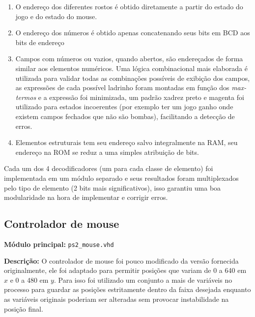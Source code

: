\documentclass[12pt]{article}
\begin{document}
\begin{enumerate}

	\item O endereço dos diferentes rostos é obtido diretamente a partir do 
		estado do jogo e do estado do mouse.
		
	\item O endereço dos números é obtido apenas concatenando seus bits em
		BCD aos bits de endereço
		
	\item Campos com números ou vazios, quando abertos, são endereçados de 
		forma similar aos elementos numéricos. Uma lógica combinacional mais elaborada é
		utilizada para validar todas as combinações possíveis de exibição dos
		campos, as expressões de cada possível ladrinho foram montadas em
		função dos \emph{max-termos} e a expressão foi minimizada, um padrão
		xadrez preto e magenta foi utilizado para estados incoerentes (por
		exemplo ter um jogo ganho onde existem campos fechados que não são 
		bombas), facilitando a detecção de erros.

	\item Elementos estruturais tem seu endereço salvo integralmente na RAM,
		seu endereço na ROM se reduz a uma simples atribuição de bits.

\end{enumerate}

Cada um dos 4 decodificadores (um para cada classe de elemento) foi 
implementada em um módulo separado e seus resultados foram multiplexados pelo
tipo de elemento (2 bits mais significativos), isso garantiu uma boa 
modularidade na hora de implementar e corrigir erros.


\subsection{Controlador de mouse}
\label{sec:ctrlmouse}

{\bf Módulo principal:} \verb|ps2_mouse.vhd|

{\bf Descrição:} O controlador de mouse foi pouco modificado da versão 
fornecida originalmente, ele foi adaptado para permitir posições que variam de
0 a 640 em $x$ e 0 a 480 em $y$. Para isso foi utilizado um conjunto a mais de
variáveis no processo para guardar as posições estritamente dentro da faixa
desejada enquanto as variáveis originais poderiam ser alteradas sem provocar
instabilidade na posição final.
\end{document}
